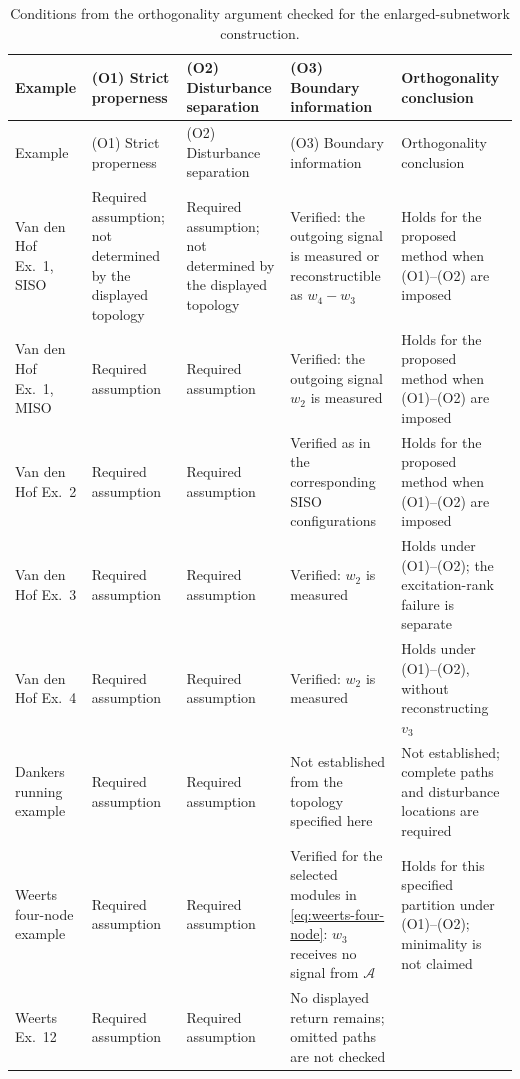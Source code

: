 \documentclass[11pt,a4paper]{article}
\newcommand{\Aset}{\mathcal A}
\begin{document}
\footnotesize
\begin{longtable}{@{}p{}p{}p{}p{}p{}@{}}
\caption{Conditions from the orthogonality argument checked for the enlarged-subnetwork construction.}
\label{tab:orthogonality-status}\\
\toprule
Example & (O1) Strict properness & (O2) Disturbance separation & (O3) Boundary information & Orthogonality conclusion \\
\midrule
\endfirsthead
\toprule
Example & (O1) Strict properness & (O2) Disturbance separation & (O3) Boundary information & Orthogonality conclusion \\
\midrule
\endhead
\bottomrule
\endfoot
Van den Hof Ex.~1, SISO
& Required assumption; not determined by the displayed topology
& Required assumption; not determined by the displayed topology
& Verified: the outgoing signal is measured or reconstructible as $w_4-w_3$
& Holds for the proposed method when (O1)--(O2) are imposed \\
\addlinespace
Van den Hof Ex.~1, MISO
& Required assumption
& Required assumption
& Verified: the outgoing signal $w_2$ is measured
& Holds for the proposed method when (O1)--(O2) are imposed \\
\addlinespace
Van den Hof Ex.~2
& Required assumption
& Required assumption
& Verified as in the corresponding SISO configurations
& Holds for the proposed method when (O1)--(O2) are imposed \\
\addlinespace
Van den Hof Ex.~3
& Required assumption
& Required assumption
& Verified: $w_2$ is measured
& Holds under (O1)--(O2); the excitation-rank failure is separate \\
\addlinespace
Van den Hof Ex.~4
& Required assumption
& Required assumption
& Verified: $w_2$ is measured
& Holds under (O1)--(O2), without reconstructing $v_3$ \\
\addlinespace
Dankers running example
& Required assumption
& Required assumption
& Not established from the topology specified here
& Not established; complete paths and disturbance locations are required \\
\addlinespace
Weerts four-node example
& Required assumption
& Required assumption
& Verified for the selected modules in \eqref{eq:weerts-four-node}: $w_3$ receives no signal from $\Aset$
& Holds for this specified partition under (O1)--(O2); minimality is not claimed \\
\addlinespace
Weerts Ex.~12
& Required assumption
& Required assumption
& No displayed return remains; omitted paths are not checked

\end{longtable}
\end{document}
